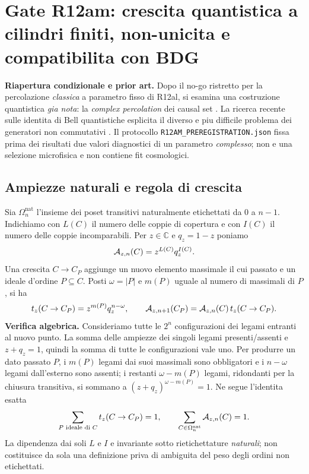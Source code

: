 \documentclass[11pt,a4paper]{article}
\begin{document}
\section{Gate R12am: crescita quantistica a cilindri finiti, non-unicita e compatibilita con BDG}
\label{sec:r12am}

\textbf{Riapertura condizionale e prior art.} Dopo il no-go ristretto per la percolazione \emph{classica} a parametro fisso di R12al, si esamina una costruzione quantistica \emph{gia nota}: la \emph{complex percolation} dei causal set \cite{Gudder2012QuantumGrowth,DowkerJohnstonSurya2010}. La ricerca recente sulle identita di Bell quantistiche esplicita il diverso e piu difficile problema dei generatori non commutativi \cite{SrivastavaSurya2026}. Il protocollo \texttt{R12AM\_PREREGISTRATION.json} fissa prima dei risultati due valori diagnostici di un parametro \emph{complesso}; non e una selezione microfisica e non contiene fit cosmologici.

\subsection{Ampiezze naturali e regola di crescita}
Sia $\Omega_n^{\mathrm{nat}}$ l'insieme dei poset transitivi naturalmente etichettati da $0$ a $n-1$. Indichiamo con $L(C)$ il numero delle coppie di copertura e con $I(C)$ il numero delle coppie incomparabili. Per $z\in\mathbb C$ e $q_z=1-z$ poniamo
\begin{equation}
 {\cal A}_{z,n}(C)=z^{L(C)}q_z^{I(C)}.
 \label{eq:r12am_amplitude}
\end{equation}
Una crescita $C\to C_P$ aggiunge un nuovo elemento massimale il cui passato e un ideale d'ordine $P\subseteq C$. Posti $\omega=|P|$ e $m(P)$ uguale al numero di massimali di $P$, si ha
\begin{equation}
 t_z(C\to C_P)=z^{m(P)}q_z^{n-\omega},\qquad
 {\cal A}_{z,n+1}(C_P)={\cal A}_{z,n}(C)\,t_z(C\to C_P).
 \label{eq:r12am_transition}
\end{equation}
\textbf{Verifica algebrica.} Consideriamo tutte le $2^n$ configurazioni dei legami entranti al nuovo punto. La somma delle ampiezze dei singoli legami presenti/assenti e $z+q_z=1$, quindi la somma di tutte le configurazioni vale uno. Per produrre un dato passato $P$, i $m(P)$ legami dai suoi massimali sono obbligatori e i $n-\omega$ legami dall'esterno sono assenti; i restanti $\omega-m(P)$ legami, ridondanti per la chiusura transitiva, si sommano a $(z+q_z)^{\omega-m(P)}=1$. Ne segue l'identita esatta
\begin{equation}
 \sum_{P\text{ ideale di }C}t_z(C\to C_P)=1,\qquad
 \sum_{C\in\Omega_n^{\mathrm{nat}}}{\cal A}_{z,n}(C)=1.
 \label{eq:r12am_norm}
\end{equation}
La dipendenza dai soli $L$ e $I$ e invariante sotto rietichettature \emph{naturali}; non costituisce da sola una definizione priva di ambiguita del peso degli ordini non etichettati.
\end{document}
